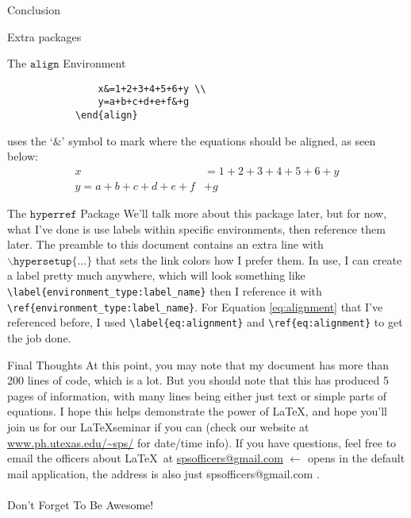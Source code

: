 \documentclass[onecolumn]{article}
\begin{document}
\begin{section}{Conclusion}
\begin{subsection}{Extra packages}
\begin{subsubsection}{The $\texttt{align}$ Environment}
\begin{verbatim}
			    x&=1+2+3+4+5+6+y \\
			    y=a+b+c+d+e+f&+g
			\end{align}
			\end{verbatim}
			uses the `$\texttt{\&}$' symbol to mark where the equations should be aligned, as seen below:
			\begin{align}
			    x&=1+2+3+4+5+6+y \\
			    y=a+b+c+d+e+f&+g
			\end{align}
		\end{subsubsection}
		\begin{subsubsection}{The $\texttt{hyperref}$ Package}
			We'll talk more about this package later, but for now, what I've done is use labels within specific environments, then reference them later. The preamble to this
			document contains an extra line with $\backslash\texttt{hypersetup\{...\}}$ that sets the link colors how I prefer them. In use, I can create a label pretty
			much anywhere, which will look something like \verb+\label{environment_type:label_name}+ then I reference it with \verb+\ref{environment_type:label_name}+.
			For Equation \ref{eq:alignment} that I've referenced before, I used \verb+\label{eq:alignment}+ and \verb+\ref{eq:alignment}+ to get the job done.
		\end{subsubsection}
	\end{subsection}
	\begin{subsection}{Final Thoughts}
		At this point, you may note that my document has more than 200 lines of code, which is a lot. But you should note that this has produced 5 pages of information,
		with many lines being either just text or simple parts of equations. I hope this helps demonstrate the power of \LaTeX, and hope you'll join us for our \LaTeX seminar
		if you can (check our website at \url{www.ph.utexas.edu/~sps/} for date/time info). If you have questions, feel free to email the officers about \LaTeX~at 
		\href{mailto:spsofficers@gmail.com}{spsofficers@gmail.com} $\leftarrow$ opens in the default mail application, the address is also just spsofficers@gmail.com .\\ \\
		Don't Forget To Be Awesome!
	\end{subsection}
\end{section}
\end{document}
